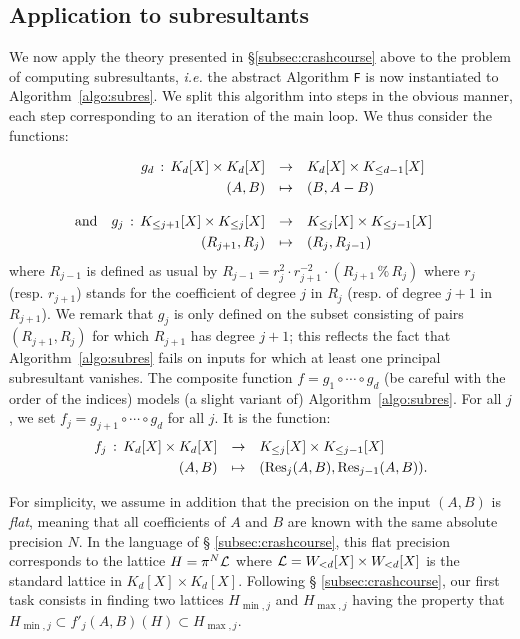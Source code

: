 \documentclass{article}
\begin{document}
\subsection{Application to subresultants}
\label{subsec:stabilization}

We now apply the theory presented in \S \ref{subsec:crashcourse} above 
to the problem of computing subresultants, \emph{i.e.} the abstract 
Algorithm \texttt{F} is now instantiated to Algorithm~\ref{algo:subres}. 
We split this algorithm into steps in the obvious manner, each step 
corresponding to an iteration of the main loop. We thus consider the
functions:

$$\begin{array}{rrclc}
&g_d \, : \, K_d[X] \times K_d[X] &\to &K_d[X] \times K_{\leq d-1}[X] 
\smallskip \\
&(A,B) & \mapsto & (B, A-B) \bigskip \\
\text{and} &g_j \, : \, 
K_{\leq j+1}[X] \times K_{\leq j}[X]
& \to & K_{\leq j}[X] \times K_{\leq j-1}[X] \smallskip \\
&(R_{j+1}, R_j) & \mapsto & (R_j, R_{j-1})
& 
\end{array}$$
where $R_{j-1}$ is defined as usual by
$R_{j-1} = r_j^2 \cdot r_{j+1}^{-2} \cdot 
(R_{j+1} \,\%\, R_j)$
where $r_j$ (resp. $r_{j+1}$) stands for the coefficient of degree $j$ 
in $R_j$ (resp. of degree $j+1$ in $R_{j+1}$). We remark that $g_j$ is 
only defined on the subset consisting of pairs $(R_{j+1}, R_j)$ for 
which $R_{j+1}$ has degree $j+1$; this reflects the fact that 
Algorithm~\ref{algo:subres} fails on inputs for which at least one 
principal
subresultant vanishes. The composite function $f = g_1 \circ \cdots 
\circ g_d$ (be careful with the order of the indices) models (a slight 
variant of) Algorithm~\ref{algo:subres}. For all $j$, we set $f_j = 
g_{j+1} \circ \cdots \circ g_d$ for all $j$. It is the function:
$$\begin{array}{rcl}
f_j \, : \, K_d[X] \times K_d[X] & \to & K_{\leq j}[X] \times 
K_{\leq j-1}[X] \smallskip \\
(A,B) & \mapsto & (\Res_j(A,B), \Res_{j-1}(A,B)).
\end{array}$$

For simplicity, we assume in addition that the precision on the input 
$(A,B)$ is \emph{flat}, meaning that all coefficients of $A$ and $B$ are 
known with the same absolute precision $N$. In the language of \S 
\ref{subsec:crashcourse}, this flat precision corresponds to the lattice 
$H = \pi^N \mathcal L$ where $\mathcal L = W_{<d}[X] \times W_{<d}[X]$ is the 
standard lattice in $K_d[X] \times K_d[X]$. Following \S 
\ref{subsec:crashcourse}, our first task consists in finding two 
lattices $H_{\min,j}$ and $H_{\max,j}$ having the property that 
$H_{\min,j} \subset f'_j(A,B)(H) \subset H_{\max,j}$.
\end{document}
